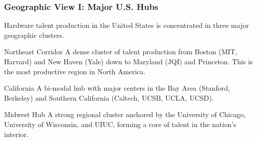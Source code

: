 \documentclass[aspectratio=169]{beamer}
\begin{document}
\begin{frame}
    \frametitle{Geographic View I: Major U.S. Hubs}
    Hardware talent production in the United States is concentrated in three major geographic clusters.
    
    \begin{block}{Northeast Corridor}
        A dense cluster of talent production from Boston (MIT, Harvard) and New Haven (Yale) down to Maryland (JQI) and Princeton. This is the most productive region in North America.
    \end{block}
    
    \begin{block}{California}
        A bi-modal hub with major centers in the Bay Area (Stanford, Berkeley) and Southern California (Caltech, UCSB, UCLA, UCSD).
    \end{block}
    
    \begin{block}{Midwest Hub}
        A strong regional cluster anchored by the University of Chicago, University of Wisconsin, and UIUC, forming a core of talent in the nation's interior.
    \end{block}
\end{frame}
\end{document}
